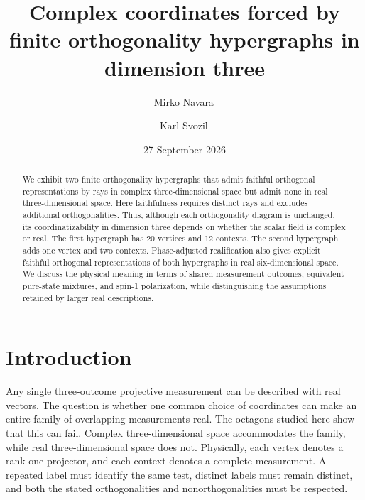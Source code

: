 \documentclass[twocolumn,aps,pra,floatfix,amsmath,amssymb,longbibliography]{revtex4-2}
\theoremstyle{definition}
\theoremstyle{remark}
\begin{document}
\title{Complex coordinates forced by finite orthogonality hypergraphs in dimension three}

\author{Mirko Navara\,}

\author{Karl Svozil\,}

\date{27 September 2026}

\begin{abstract}
We exhibit two finite orthogonality hypergraphs that admit faithful orthogonal representations by rays in complex three-dimensional space but admit none in real three-dimensional space. Here faithfulness requires distinct rays and excludes additional orthogonalities. Thus, although each orthogonality diagram is unchanged, its coordinatizability in dimension three depends on whether the scalar field is complex or real. The first hypergraph has 20 vertices and 12 contexts. The second hypergraph adds one vertex and two contexts. Phase-adjusted realification also gives explicit faithful orthogonal representations of both hypergraphs in real six-dimensional space. We discuss the physical meaning in terms of shared measurement outcomes, equivalent pure-state mixtures, and spin-1 polarization, while distinguishing the assumptions retained by larger real descriptions.
\end{abstract}

\maketitle

\section{Introduction}

Any single three-outcome projective measurement can be described with real
vectors.  The question is whether one common choice of coordinates can
make an entire family of overlapping measurements real.  The octagons
studied here show that this can fail.  Complex three-dimensional space
accommodates the family, while real three-dimensional space does not.
Physically, each vertex denotes a rank-one projector, and each context
denotes a complete measurement.  A repeated label must identify the same
test, distinct labels must remain distinct, and both the stated
orthogonalities and nonorthogonalities must be respected.
\end{document}
